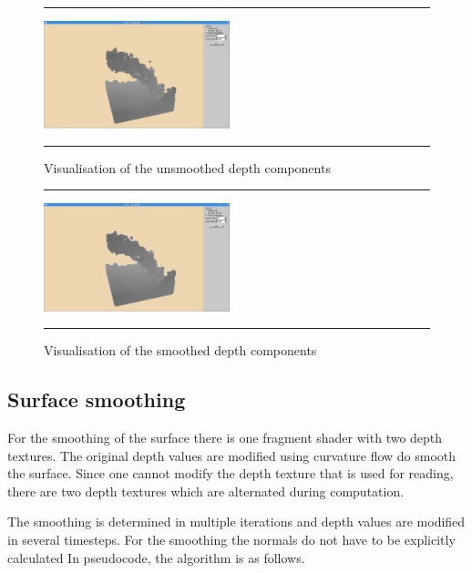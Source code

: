 \begin{figure}[!th]
\hrule
\begin{center}
\vspace*{2ex}\includegraphics[width=0.48\textwidth,clip=true,trim=10cm 1cm 10cm 3cm]{pictures/depth_normal.png}
\end{center}
\caption{Visualisation of the unsmoothed depth components}
\label{fig:depth} 
\vspace*{2ex}
\hrule
\end{figure}

\begin{figure}[!th]
\hrule
\begin{center}
\vspace*{2ex}\includegraphics[width=0.48\textwidth,clip=true,trim=10cm 1cm 10cm 3cm]{pictures/depth_smoothed.png}
\end{center}
\caption{Visualisation of the smoothed depth components}
\label{fig:depth} 
\vspace*{2ex}
\hrule
\end{figure}


\subsection{Surface smoothing}
For the smoothing of the surface there is one fragment shader with two depth textures.
The original depth values are modified using curvature flow do smooth the surface.
Since one cannot modify the depth texture that is used for reading, there are two depth textures which are alternated during computation.

The smoothing is determined in multiple iterations and depth values are modified in several timesteps.
For the smoothing the normals do not have to be explicitly calculated
In pseudocode, the algorithm is as follows.

